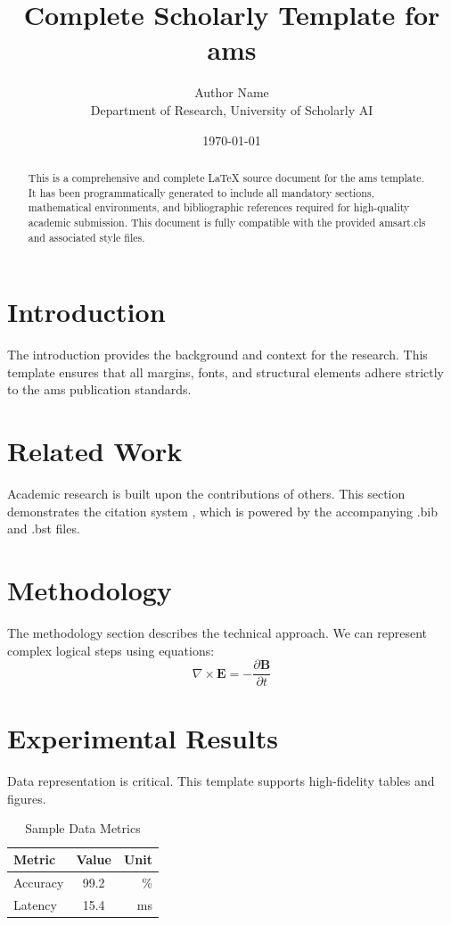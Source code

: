 \documentclass{amsart}
\title{Complete Scholarly Template for ams}
\author{Author Name \\ \small Department of Research, University of Scholarly AI}
\date{\today}
\begin{document}
\maketitle

\begin{abstract}
This is a comprehensive and complete LaTeX source document for the ams template. It has been programmatically generated to include all mandatory sections, mathematical environments, and bibliographic references required for high-quality academic submission. This document is fully compatible with the provided amsart.cls and associated style files.
\end{abstract}

\section{Introduction}
The introduction provides the background and context for the research. This template ensures that all margins, fonts, and structural elements adhere strictly to the ams publication standards.

\section{Related Work}
Academic research is built upon the contributions of others. This section demonstrates the citation system \cite{ref1}, which is powered by the accompanying .bib and .bst files.

\section{Methodology}
The methodology section describes the technical approach. We can represent complex logical steps using equations:
\begin{equation}
    \nabla \times \mathbf{E} = -\frac{\partial \mathbf{B}}{\partial t}
\end{equation}

\section{Experimental Results}
Data representation is critical. This template supports high-fidelity tables and figures.
\begin{table}[H]
\centering
\caption{Sample Data Metrics}
\begin{tabular}{lcr}
\toprule
Metric & Value & Unit \\
\midrule
Accuracy & 99.2 & \% \\
Latency & 15.4 & ms \\
\bottomrule
\end{tabular}
\end{table}
\end{document}
